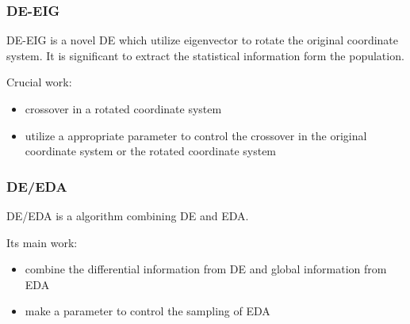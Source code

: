 \documentclass[xcolor=dvipsnames]{beamer}
\begin{document}
    \begin{frame}
    \frametitle{DE-EIG}
    DE-EIG is a novel DE which utilize eigenvector to rotate the original coordinate system. It is significant to extract the statistical information form the population.
    \begin{block}{Crucial work:}
    \begin{itemize}
    \item crossover in a rotated coordinate system
    \item utilize a appropriate parameter to control the crossover in the original coordinate system or the rotated coordinate system
    \end{itemize}
    \end{block}
    \end{frame}

    \begin{frame}
    \frametitle{DE/EDA}
    DE/EDA is a algorithm combining DE and EDA.

    Its main work:
    \begin{itemize}
    \item combine the differential information from DE and global information from EDA
    \item make a parameter to control the sampling of EDA
    \end{itemize}
    \end{frame}
\end{document}
